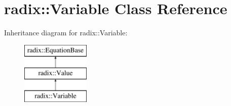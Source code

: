 \hypertarget{classradix_1_1Variable}{}\section{radix\+:\+:Variable Class Reference}
\label{classradix_1_1Variable}
Inheritance diagram for radix\+:\+:Variable\+:\begin{figure}[H]
\begin{center}
\leavevmode
\includegraphics[height=3.000000cm]{classradix_1_1Variable}
\end{center}
\end{figure}
